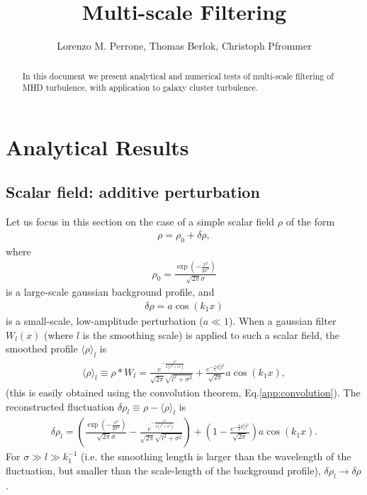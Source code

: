 \documentclass[]{article}
\title{Multi-scale Filtering}
\author{Lorenzo M. Perrone, Thomas Berlok, Christoph Pfrommer}
\begin{document}
\maketitle

\begin{abstract}
In this document we present analytical and numerical tests of multi-scale filtering of MHD turbulence, with application to galaxy cluster turbulence.
\end{abstract}

\section{Analytical Results}


\subsection{Scalar field: additive perturbation}

Let us focus in this section on the case of a simple scalar field $\rho$ of the form
%
\begin{align}
	\rho = \rho_0 + \delta \rho,
\end{align}
%
where
%
\begin{align}
	\rho_0 =\frac{\exp \left(-\frac{x^2}{2 \sigma ^2}\right)}{\sqrt{2 \pi } \sigma }
\end{align}
%
is a large-scale gaussian background profile, and
%
\begin{align}
	\delta \rho = a \cos \left(k_1 x\right)
\end{align}
%
is a small-scale, low-amplitude perturbation ($a \ll 1$). When a gaussian filter $ W_l (x)$ (where $l$ is the smoothing scale) is applied to such a scalar field, the smoothed profile $\langle \rho \rangle_l$ is 
%
\begin{align}
	\langle \rho \rangle_l \equiv \rho * W_l = \frac{e^{-\frac{x^2}{2 \left(l^2+\sigma^2\right)}}}{\sqrt{2 \pi}  \sqrt{l^2+\sigma ^2}} + \frac{e^{-\frac{1}{2} k_1^2 l^2} }{\sqrt{2 \pi }} a \cos (k_1 x),
\end{align}
%
(this is easily obtained using the convolution theorem, Eq.\eqref{app:convolution}). The reconstructed fluctuation $\delta \rho_l \equiv \rho - \langle \rho \rangle_l$ is
%
\begin{align}
	\delta \rho_l = \left( \frac{\exp \left(-\frac{x^2}{2 \sigma ^2}\right)}{\sqrt{2 \pi } \sigma } - \frac{e^{-\frac{x^2}{2 \left(l^2+\sigma^2\right)}}}{\sqrt{2 \pi}  \sqrt{l^2+\sigma ^2}} \right) + \left( 1 - \frac{e^{-\frac{1}{2} k_1^2 l^2} }{\sqrt{2 \pi }} \right) a \cos (k_1 x).
\end{align}
%
For $\sigma \gg l \gg k_1^{-1}$ (i.e. the smoothing length is larger than the wavelength of the fluctuation, but smaller than the scale-length of the background profile), $\delta \rho_l \rightarrow \delta \rho$.
\end{document}
